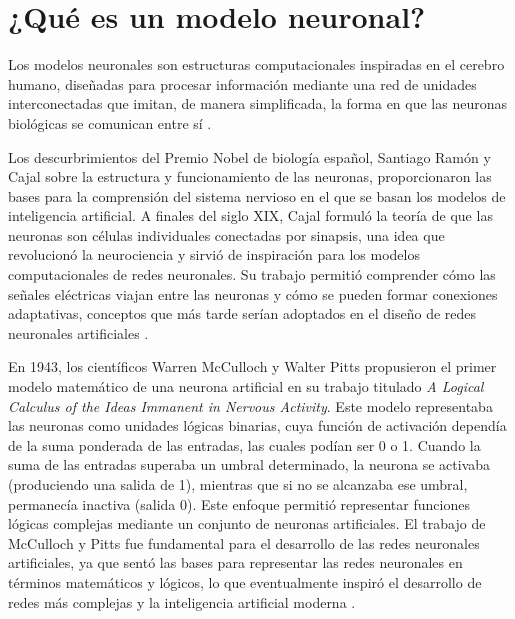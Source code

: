 
\section{¿Qué es un modelo neuronal?}


Los modelos neuronales son estructuras computacionales inspiradas en el cerebro humano, diseñadas para procesar información mediante una red de unidades interconectadas que imitan, de manera simplificada, la forma en que las neuronas biológicas se comunican entre sí \cite{goodfellow2016deep}.

Los descurbrimientos del Premio Nobel de biología español, Santiago Ramón y Cajal sobre la estructura y funcionamiento de las neuronas, proporcionaron las bases para la comprensión del sistema nervioso en el que se basan los modelos de inteligencia artificial. A finales del siglo XIX, Cajal formuló la teoría de que las neuronas son células individuales conectadas por sinapsis, una idea que revolucionó la neurociencia y sirvió de inspiración para los modelos computacionales de redes neuronales. Su trabajo permitió comprender cómo las señales eléctricas viajan entre las neuronas y cómo se pueden formar conexiones adaptativas, conceptos que más tarde serían adoptados en el diseño de redes neuronales artificiales \cite{leCun2015}.


En 1943, los científicos Warren McCulloch y Walter Pitts propusieron el primer modelo matemático de una neurona artificial en su trabajo titulado \textit{A Logical Calculus of the Ideas Immanent in Nervous Activity}. Este modelo representaba las neuronas como unidades lógicas binarias, cuya función de activación dependía de la suma ponderada de las entradas, las cuales podían ser 0 o 1. Cuando la suma de las entradas superaba un umbral determinado, la neurona se activaba (produciendo una salida de 1), mientras que si no se alcanzaba ese umbral, permanecía inactiva (salida 0). Este enfoque permitió representar funciones lógicas complejas mediante un conjunto de neuronas artificiales. El trabajo de McCulloch y Pitts fue fundamental para el desarrollo de las redes neuronales artificiales, ya que sentó las bases para representar las redes neuronales en términos matemáticos y lógicos, lo que eventualmente inspiró el desarrollo de redes más complejas y la inteligencia artificial moderna \cite{mcculloch1943logical}.


